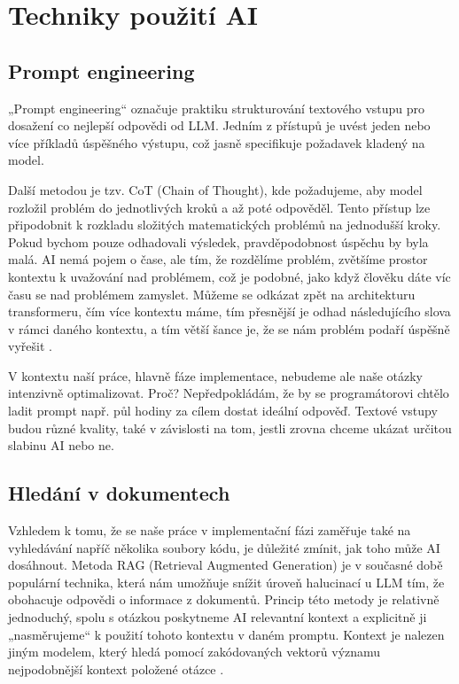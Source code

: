 \documentclass[FM,DP]{tulthesis}
\begin{document}
		\section{Techniky použití AI} 
		\subsection{Prompt engineering}
		„Prompt engineering“ označuje praktiku strukturování textového vstupu pro dosažení co nejlepší odpovědi od LLM. Jedním z přístupů je uvést jeden nebo více příkladů úspěšného výstupu, což jasně specifikuje požadavek kladený na model. 
		
		Další metodou je tzv. CoT (Chain of Thought), kde požadujeme, aby model rozložil problém do jednotlivých kroků a až poté odpověděl. Tento přístup lze připodobnit k rozkladu složitých matematických problémů na jednodušší kroky. Pokud bychom pouze odhadovali výsledek, pravděpodobnost úspěchu by byla malá. AI nemá pojem o čase, ale tím, že rozdělíme problém, zvětšíme prostor kontextu k uvažování nad problémem, což je podobné, jako když člověku dáte víc času se nad problémem zamyslet. Můžeme se odkázat zpět na architekturu transformeru, čím více kontextu máme, tím přesnější je odhad následujícího slova v rámci daného kontextu, a tím větší šance je, že se nám problém podaří úspěšně vyřešit \cite{PEG}.
		
		V kontextu naší práce, hlavně fáze implementace, nebudeme ale naše otázky intenzivně optimalizovat. Proč? Nepředpokládám, že by se programátorovi chtělo ladit prompt např. půl hodiny za cílem dostat ideální odpověď. Textové vstupy budou různé kvality, také v závislosti na tom, jestli zrovna chceme ukázat určitou slabinu AI nebo ne. 
		
		\subsection{Hledání v dokumentech}
		Vzhledem k tomu, že se naše práce v implementační fázi zaměřuje také na vyhledávání napříč několika soubory kódu, je důležité zmínit, jak toho může AI dosáhnout. Metoda RAG (Retrieval Augmented Generation) je v současné době populární technika, která nám umožňuje snížit úroveň halucinací u LLM tím, že obohacuje odpovědi o informace z dokumentů. Princip této metody je relativně jednoduchý, spolu s otázkou poskytneme AI relevantní kontext a explicitně ji „nasměrujeme“ k použití tohoto kontextu v daném promptu. Kontext je nalezen jiným modelem, který hledá pomocí zakódovaných vektorů významu nejpodobnější kontext položené otázce \cite{paper:RAG}.
		
\end{document}
